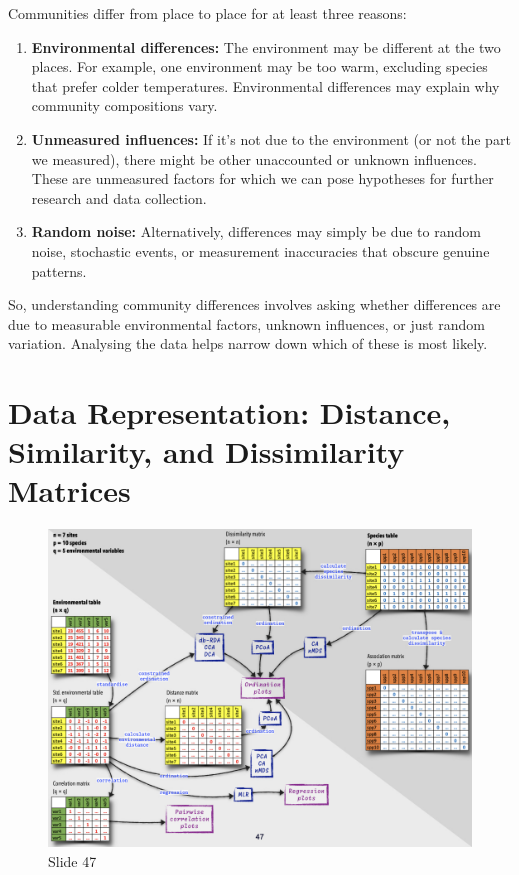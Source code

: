 \documentclass[
  10pt,
]{book}
\begin{document}
Communities differ from place to place for at least three reasons:

\begin{enumerate}
\def\labelenumi{\arabic{enumi}.}
\item
  \textbf{Environmental differences:} The environment may be different
  at the two places. For example, one environment may be too warm,
  excluding species that prefer colder temperatures. Environmental
  differences may explain why community compositions vary.
\item
  \textbf{Unmeasured influences:} If it's not due to the environment (or
  not the part we measured), there might be other unaccounted or unknown
  influences. These are unmeasured factors for which we can pose
  hypotheses for further research and data collection.
\item
  \textbf{Random noise:} Alternatively, differences may simply be due to
  random noise, stochastic events, or measurement inaccuracies that
  obscure genuine patterns.
\end{enumerate}

So, understanding community differences involves asking whether
differences are due to measurable environmental factors, unknown
influences, or just random variation. Analysing the data helps narrow
down which of these is most likely.

\section{Data Representation: Distance, Similarity, and Dissimilarity
Matrices}\label{data-representation-distance-similarity-and-dissimilarity-matrices}

\begin{figure}[ht]
\centering
\includegraphics[width=0.8\linewidth]{../images/BDC334/BDC334-047.jpeg}
\caption*{Slide 47}
\end{figure}
\end{document}
